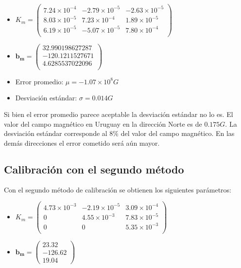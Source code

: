 \documentclass[spanish,12pt,a4paper,titlepage]{report}
\begin{document}
\begin{itemize}
\item $K_m=\left(\begin{array}{ccc}
      7.24\times10^{-4}   &  -2.79\times10^{-5}  &   -2.63\times10^{-5}\\
      8.03\times10^{-5}   &  7.23\times10^{-4}   &   1.89\times10^{-5}\\
      6.19\times10^{-5}   &  -5.07\times10^{-5}  &    7.80\times10^{-4}\\
	
\end{array}  \right)$
\item $\mathbf{b_m}= \left( \begin{array}{c}
  32.990198627287\\
           -120.1211527671\\
           4.6285537022096\\
\end{array}\right)
$
\item Error promedio: $ \mu = -1.07\times10^{8} G$\\
\item Desviación estándar: $\sigma =0.014 G$
\end{itemize}

Si bien el error promedio parece aceptable la desviación estándar no lo es. El valor del campo magnético en Uruguay en la dirección Norte es de $0.175 G$. La desviación estándar corresponde al $8\%$ del valor del campo magnético. En las demás direcciones el error cometido será aún mayor.\\


\subsection{Calibración con el segundo método}
Con el segundo método de calibración se obtienen los siguientes parámetros:
\begin{itemize}


\item $K_m=\left( \begin{array}{ccc}
 4.73\times10^{-3}   &  -2.19\times10^{-5}    &  3.09\times10^{-4} \\
                         0      & 4.55\times10^{-3}   &   7.83\times10^{-5} \\
                         0     &                    0   &    5.35\times10^{-3} \\
\end{array}
\right)
$

\item $
\mathbf{b_m}=\left(\begin{array}{c}
	23.32\\
	-126.62\\
    19.04
\end{array}\right)
$
\end{itemize}
\end{document}
